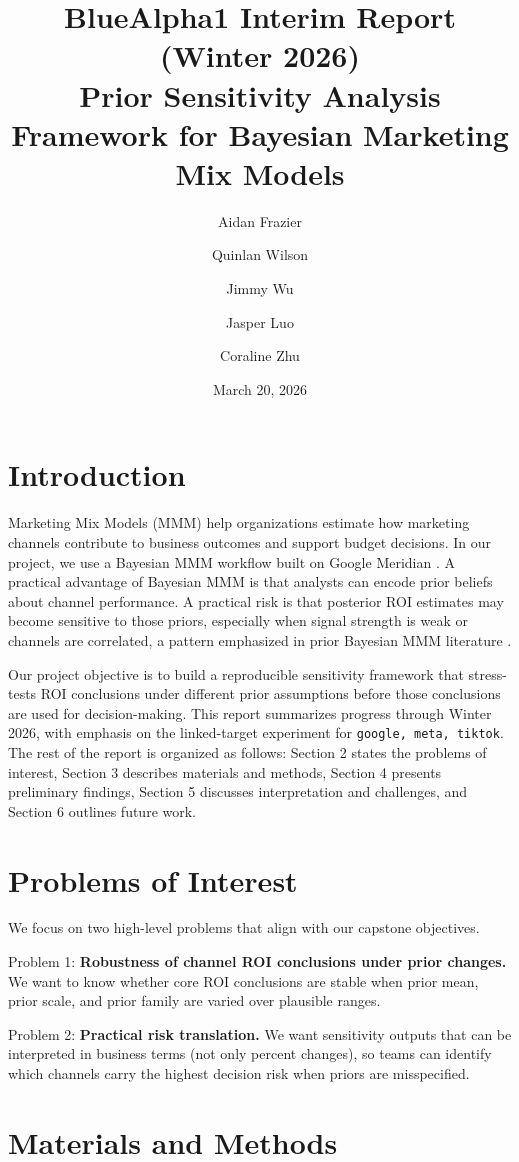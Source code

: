 ﻿\documentclass[11pt]{article}
\title{BlueAlpha1 Interim Report (Winter 2026)\\
Prior Sensitivity Analysis Framework for Bayesian Marketing Mix Models}
\author{
Aidan Frazier \and Quinlan Wilson \and Jimmy Wu \and Jasper Luo \and Coraline Zhu
}
\date{March 20, 2026}
\begin{document}
\maketitle

\section{Introduction}
Marketing Mix Models (MMM) help organizations estimate how marketing channels contribute to business outcomes and support budget decisions. In our project, we use a Bayesian MMM workflow built on Google Meridian \cite{meridian_model_spec,meridian_configure}. A practical advantage of Bayesian MMM is that analysts can encode prior beliefs about channel performance. A practical risk is that posterior ROI estimates may become sensitive to those priors, especially when signal strength is weak or channels are correlated, a pattern emphasized in prior Bayesian MMM literature \cite{jin2017}.

Our project objective is to build a reproducible sensitivity framework that stress-tests ROI conclusions under different prior assumptions before those conclusions are used for decision-making. This report summarizes progress through Winter 2026, with emphasis on the linked-target experiment for \texttt{google, meta, tiktok}. The rest of the report is organized as follows: Section 2 states the problems of interest, Section 3 describes materials and methods, Section 4 presents preliminary findings, Section 5 discusses interpretation and challenges, and Section 6 outlines future work.

\section{Problems of Interest}
We focus on two high-level problems that align with our capstone objectives.

Problem 1: \textbf{Robustness of channel ROI conclusions under prior changes.} We want to know whether core ROI conclusions are stable when prior mean, prior scale, and prior family are varied over plausible ranges.

Problem 2: \textbf{Practical risk translation.} We want sensitivity outputs that can be interpreted in business terms (not only percent changes), so teams can identify which channels carry the highest decision risk when priors are misspecified.

\section{Materials and Methods}
\end{document}
